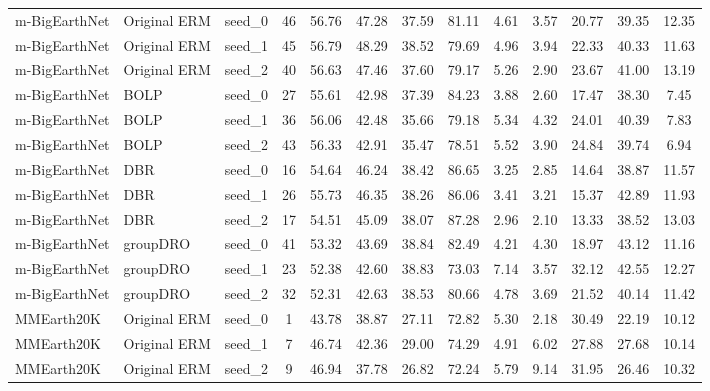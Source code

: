 \documentclass[11pt]{article}
\begin{document}
\begin{table}[h!]
{\begin{tabular}{lllcccccccccc}
\midrule

m-BigEarthNet & Original ERM & seed\_0 & 46 & 56.76 & 47.28 & 37.59 & 81.11 & 4.61 & 3.57 & 20.77 & 39.35 & 12.35 \\
m-BigEarthNet & Original ERM & seed\_1 & 45 & 56.79 & 48.29 & 38.52 & 79.69 & 4.96 & 3.94 & 22.33 & 40.33 & 11.63 \\
m-BigEarthNet & Original ERM & seed\_2 & 40 & 56.63 & 47.46 & 37.60 & 79.17 & 5.26 & 2.90 & 23.67 & 41.00 & 13.19 \\

m-BigEarthNet & BOLP & seed\_0 & 27 & 55.61 & 42.98 & 37.39 & 84.23 & 3.88 & 2.60 & 17.47 & 38.30 & 7.45 \\
m-BigEarthNet & BOLP & seed\_1 & 36 & 56.06 & 42.48 & 35.66 & 79.18 & 5.34 & 4.32 & 24.01 & 40.39 & 7.83 \\
m-BigEarthNet & BOLP & seed\_2 & 43 & 56.33 & 42.91 & 35.47 & 78.51 & 5.52 & 3.90 & 24.84 & 39.74 & 6.94 \\

m-BigEarthNet & DBR & seed\_0 & 16 & 54.64 & 46.24 & 38.42 & 86.65 & 3.25 & 2.85 & 14.64 & 38.87 & 11.57 \\
m-BigEarthNet & DBR & seed\_1 & 26 & 55.73 & 46.35 & 38.26 & 86.06 & 3.41 & 3.21 & 15.37 & 42.89 & 11.93 \\
m-BigEarthNet & DBR & seed\_2 & 17 & 54.51 & 45.09 & 38.07 & 87.28 & 2.96 & 2.10 & 13.33 & 38.52 & 13.03 \\

m-BigEarthNet & groupDRO & seed\_0 & 41 & 53.32 & 43.69 & 38.84 & 82.49 & 4.21 & 4.30 & 18.97 & 43.12 & 11.16 \\
m-BigEarthNet & groupDRO & seed\_1 & 23 & 52.38 & 42.60 & 38.83 & 73.03 & 7.14 & 3.57 & 32.12 & 42.55 & 12.27 \\
m-BigEarthNet & groupDRO & seed\_2 & 32 & 52.31 & 42.63 & 38.53 & 80.66 & 4.78 & 3.69 & 21.52 & 40.14 & 11.42 \\

\midrule

MMEarth20K & Original ERM & seed\_0 & 1 & 43.78 & 38.87 & 27.11 & 72.82 & 5.30 & 2.18 & 30.49 & 22.19 & 10.12 \\
MMEarth20K & Original ERM & seed\_1 & 7 & 46.74 & 42.36 & 29.00 & 74.29 & 4.91 & 6.02 & 27.88 & 27.68 & 10.14 \\
MMEarth20K & Original ERM & seed\_2 & 9 & 46.94 & 37.78 & 26.82 & 72.24 & 5.79 & 9.14 & 31.95 & 26.46 & 10.32 \\


\end{tabular}}
\end{table}
\end{document}
